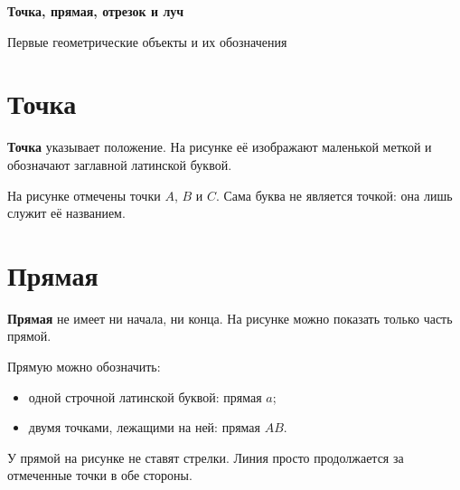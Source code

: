 
\begin{center}
  {\fontsize{25}{30}\selectfont\bfseries\sffamily\color{Primary}
    Точка, прямая, отрезок и луч}

  \vspace{0.3em}

  {\large\sffamily\color{GrayText}
    Первые геометрические объекты и их обозначения}
\end{center}

\vspace{0.45em}

\section{Точка}

\begin{propertybox}[Определение]
  \textbf{Точка} указывает положение. На рисунке её изображают маленькой
  меткой и обозначают заглавной латинской буквой.
\end{propertybox}

\pointsexamplefigure

На рисунке отмечены точки \(A\), \(B\) и \(C\). Сама буква не является
точкой: она лишь служит её названием.

\section{Прямая}

\begin{propertybox}
  \textbf{Прямая} не имеет ни начала, ни конца. На рисунке можно показать
  только часть прямой.
\end{propertybox}

\lineexamplefigure

Прямую можно обозначить:
\begin{itemize}
  \item одной строчной латинской буквой: прямая \(a\);
  \item двумя точками, лежащими на ней: прямая \(AB\).
\end{itemize}

\begin{notebox}
  У прямой на рисунке не ставят стрелки. Линия просто продолжается за
  отмеченные точки в обе стороны.
\end{notebox}

